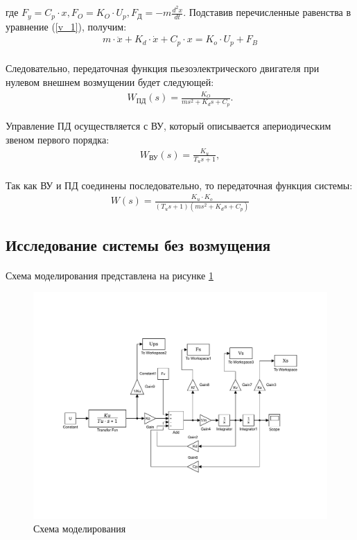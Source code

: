 \documentclass[a4paper,12pt]{article}
\begin{document}
		где $F_y = C_p\cdot x, F_O = K_O\cdot U_p, F_\text{Д} = -m\displaystyle{\frac{d^2x}{d t}}$. Подставив перечисленные равенства в уравнение (\ref{v_1}), получим:
		\begin{gather}
		m\cdot\ddot{x} + K_d\cdot\dot{x} + C_p\cdot x = K_o\cdot U_p + F_B
		\end{gather}\\
		
		Следовательно, передаточная функция пьезоэлектрического двигателя при нулевом внешнем возмущении будет следующей:
		\begin{gather} \label{v_2}
		W_\text{ПД}(s) = \displaystyle{\frac{K_O}{ms^2 + K_ds + C_p}}.
		\end{gather}
		
		Управление ПД осуществляется с ВУ, который описывается апериодическим звеном первого порядка:
		\begin{gather}
		W_\text{ВУ}(s) = \frac{K_u}{T_us + 1},
		\end{gather}\\
		
		Так как ВУ и ПД соединены последовательно, то передаточная функция системы:
		\begin{gather}
		\label{v_3}
		W(s)=\frac{K_u\cdot K_o}{(T_u s+1)(ms^2+K_d s+C_p)} 
		\end{gather}
	
	
	
	\newpage
	\begin{center}
	\section{Исследование системы без возмущения}
	\end{center}
	\paragraph {} Схема моделирования представлена на рисунке \ref{s_1}
	
	\begin{figure}[h]
		\renewcommand{\figurename}{Рисунок}
		\centering
		\includegraphics[width=6in]{Labb11.pdf}
		\caption{Схема моделирования}
		\label{s_1}
	\end{figure}
\end{document}
